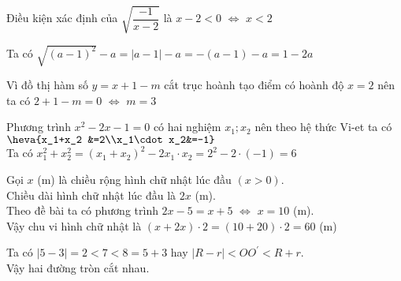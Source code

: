 \protect {}
\begin{loigiaiex}{1}
  Điều kiện xác định của $\sqrt {\dfrac {-1}{x-2}}$ là $x-2<0$ $\Leftrightarrow $ $x<2$  \phantom {a}\hfill { \faKey ~} 
\end{loigiaiex}
\begin{loigiaiex}{2}
  Ta có $\sqrt {(a-1)^2}-a = |a-1|-a = -(a-1) -a =1-2a$  \phantom {a}\hfill { \faKey ~} 
\end{loigiaiex}
\begin{loigiaiex}{3}
  Vì đồ thị hàm số $y=x+1-m$ cắt trục hoành tạo điểm có hoành độ $x=2$ nên ta có $2+1-m =0 $ $\Leftrightarrow $ $m=3$  \phantom {a}\hfill { \faKey ~} 
\end{loigiaiex}
\begin{loigiaiex}{4}
  Phương trình $x^2-2x-1=0$ có hai nghiệm $x_1; x_2$ nên theo hệ thức Vi-et ta có $\heva {x_1+x_2 &=2\\x_1\cdot x_2&=-1}$\\ Ta có $x_1^2 +x_2^2 =\left ( x_1+x_2\right )^2-2x_1\cdot x_2 =2^2-2\cdot (-1) =6$  \phantom {a}\hfill { \faKey ~} 
\end{loigiaiex}
\begin{loigiaiex}{5}
  Gọi $x$ (m) là chiều rộng hình chữ nhật lúc đầu $\left (x>0\right )$. \\ Chiều dài hình chữ nhật lúc đầu là $2x$ (m). \\ Theo đề bài ta có phương trình $2x-5=x+5$ $\Leftrightarrow $ $x=10$ (m).\\Vậy chu vi hình chữ nhật là $\left (x+2x\right )\cdot 2 = \left (10+20\right )\cdot 2 =60$ (m)  \phantom {a}\hfill { \faKey ~} 
\end{loigiaiex}
\begin{loigiaiex}{6}
  Ta có $|5-3|=2<7<8=5+3$ hay $|R-r|<OO^\prime <R+r$. \\ Vậy hai đường tròn cắt nhau.  \phantom {a}\hfill { \faKey ~} 
\end{loigiaiex}
\begin{loigiaiex}{7}
    \phantom {a}\hfill { \faKey ~} 
\end{loigiaiex}
\begin{loigiaiex}{8}
  \phantom {a}\hfill { \faKey ~} 
\end{loigiaiex}

